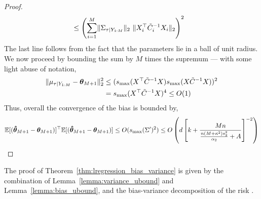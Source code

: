 \begin{proof}
\begin{align*}
    &\le \left(\sum^{M}_{i=1}\norm{\CovPosXTau}_2 \ \norm{\DXi{i}^\top\posC{i}^{-1}\DXi{i}}_2\right)^2
\end{align*}
The last line follows from the fact that the parameters lie in a ball of unit radius. We now proceed by bounding the sum by $M$ times the supremum --- with some light abuse of notation,
\begin{align*}
    \lVert \mu_{\tau \vert Y_{1:M}}- \bm{\theta}_{M+1} \rVert_2^2 &\le ({s_{\max}}(X^\top \tilde{C}_{}^{-1} X){s_{\max}}(X_{}\tilde{C}_{}^{-1}X_{}))^2\\
    &= {s_{\max}}(X^\top \tilde{C}_{}^{-1} X)^4 \le O(1)\\
\end{align*}
Thus, overall the convergence of the bias is bounded by,
\[\mathbb{E}[(\bm{\hat{\theta}}_{M+1} - \bm{\theta}_{M+1})]^\top\mathbb{E}[(\bm{\hat{\theta}}_{M+1} - \bm{\theta}_{M+1})] \le O({s_{\max}}({\Sigma'})^2) \le O\left(d \left[ {k} + 
\frac{M{n}}{\frac{{n} (M +\kappa^2)s_2^2}{\alpha_2} + A} \right]^{-2}\right)\]
\end{proof}

The proof of Theorem~\ref{thm:lregression_bias_variance} is given by the combination of Lemma~\ref{lemma:variance_ubound} and Lemma~\ref{lemma:bias_ubound}, and the bias-variance decomposition of the risk .